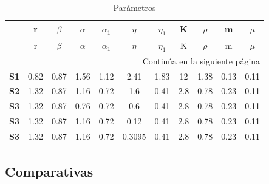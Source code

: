 \documentclass{wscpaperproc}
\theoremstyle{wsc}
\begin{document}
\begin{longtable}{rcccccccccc}
	\caption{Par\'ametros\label{tab:first}}                                                                \\
	\hline
	            & r    & $\beta$ & $\alpha$ & $\alpha_1$ & $\eta$ & $\eta_1$ & K   & $\rho$ & m    & $\mu$ \\ \hline
	\endfirsthead
	\hline
	            & r    & $\beta$ & $\alpha$ & $\alpha_1$ & $\eta$ & $\eta_1$ & K   & $\rho$ & m    & $\mu$ \\ \hline
	\endhead
	\hline
	\multicolumn{11}{|r|}{{Continúa en la siguiente página}}                                               \\ \hline
	\endfoot
	\hline
	\endlastfoot
	\textbf{S1} & 0.82 & 0.87    & 1.56     & 1.12       & 2.41   & 1.83     & 12  & 1.38   & 0.13 & 0.11  \\
	\textbf{S2} & 1.32 & 0.87    & 1.16     & 0.72       & 1.6    & 0.41     & 2.8 & 0.78   & 0.23 & 0.11  \\
	\textbf{S3} & 1.32 & 0.87    & 0.76     & 0.72       & 0.6    & 0.41     & 2.8 & 0.78   & 0.23 & 0.11  \\
	\textbf{S3} & 1.32 & 0.87    & 1.16     & 0.72       & 0.12   & 0.41     & 2.8 & 0.78   & 0.23 & 0.11  \\
	\textbf{S3} & 1.32 & 0.87    & 1.16     & 0.72       & 0.3095 & 0.41     & 2.8 & 0.78   & 0.23 & 0.11  \\
\end{longtable}

\subsection{Comparativas}
\end{document}
